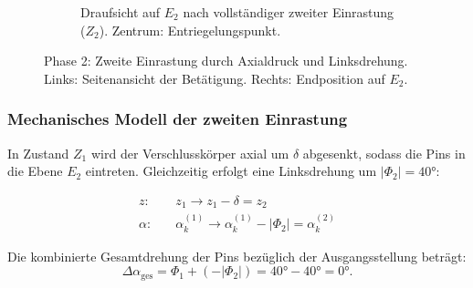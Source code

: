 ﻿\documentclass[12pt, a4paper]{article}
\theoremstyle{remark}
\begin{document}
\begin{figure}[H]
\begin{subfigure}[b]{0.48\textwidth}
    \caption{Draufsicht auf $E_2$ nach vollständiger zweiter Einrastung ($Z_2$). Zentrum: Entriegelungspunkt.}
  \end{subfigure}
  \caption{Phase 2: Zweite Einrastung durch Axialdruck und Linksdrehung. Links: Seitenansicht der Betätigung. Rechts: Endposition auf $E_2$.}
  \label{fig:phase2}
\end{figure}

\subsubsection{Mechanisches Modell der zweiten Einrastung}

In Zustand $Z_1$ wird der Verschlusskörper axial um $\delta$ abgesenkt, sodass die
Pins in die Ebene $E_2$ eintreten. Gleichzeitig erfolgt eine Linksdrehung um $|\Phi_2| = 40 °$:

\begin{align}
  z: \quad & z_1 \to z_1 - \delta = z_2 \\
  \alpha: \quad & \alpha_k^{(1)} \to \alpha_k^{(1)} - |\Phi_2| = \alpha_k^{(2)}
\end{align}

Die kombinierte Gesamtdrehung der Pins bezüglich der Ausgangsstellung beträgt:
\begin{equation}
  \Delta\alpha_{\text{ges}} = \Phi_1 + (-|\Phi_2|) = 40 ° - 40 ° = 0 °.
\end{equation}
\end{document}
